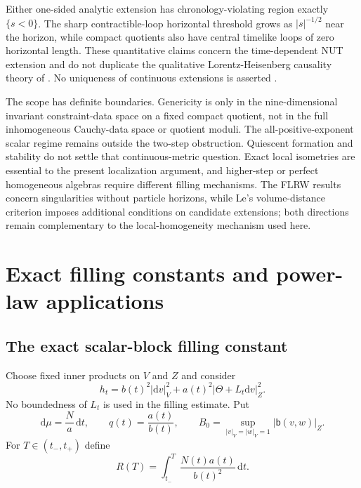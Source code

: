 \documentclass[10pt,a4paper]{article}
\numberwithin{equation}{section}
\theoremstyle{definition}
\theoremstyle{remark}
\newcommand{\dd}{\mathrm d}
\begin{document}
Either one-sided analytic extension has chronology-violating region
exactly $\{s<0\}$.  The sharp contractible-loop horizontal threshold
grows as $|s|^{-1/2}$ near the horizon, while compact quotients also have
central timelike loops of zero horizontal length.  These quantitative
claims concern the time-dependent NUT extension and do not duplicate the
qualitative Lorentz-Heisenberg causality theory of
\cite{GuediriLorentz2003,GuediriGlobal2003,GuediriCriterion2008}.  No
uniqueness of continuous extensions is asserted
\cite{SbierskiUniqueness}.

The scope has definite boundaries.  Genericity is only in the
nine-dimensional invariant constraint-data space on a fixed compact
quotient, not in the full inhomogeneous Cauchy-data space or quotient
moduli.  The all-positive-exponent scalar regime remains outside the
two-step obstruction.  Quiescent formation and stability
\cite{FournodavlosRodnianskiSpeck2023,OudeGroenigerPetersenRingstrom,
FrancoGrisalesRingstrom2026,FrancoGrisalesLocalized2026}
do not settle that continuous-metric question.  Exact local isometries
are essential to the present localization argument, and higher-step or
perfect homogeneous algebras require different filling mechanisms.  The
FLRW results \cite{SbierskiFLRW,LingFLRW} concern singularities without
particle horizons, while Le's volume-distance criterion
\cite{LeVDR} imposes additional conditions on candidate extensions; both
directions remain complementary to the local-homogeneity mechanism used
here.

\clearpage

\appendix
\section{Exact filling constants and power-law applications}
\label{sec:applications}

\subsection{The exact scalar-block filling constant}

Choose fixed inner products on $V$ and $Z$ and consider
\begin{equation}
 h_t=b(t)^2|\dd v|_V^2+
 a(t)^2|\Theta+L_t\dd v|_Z^2.
 \label{eq:scalar-block-metric}
\end{equation}
No boundedness of $L_t$ is used in the filling estimate.  Put
\begin{equation}
 \dd\mu=\frac Na\,\dd t,
 \qquad q(t)=\frac{a(t)}{b(t)},
 \qquad
 B_0=\sup_{|v|_V=|w|_V=1}|\mathsf b(v,w)|_Z.
 \label{eq:scalar-data}
\end{equation}
For $T\in(t_-,t_+)$ define
\begin{equation}
 R(T)=\int_{t_-}^T\frac{N(t)a(t)}{b(t)^2}\,\dd t.
 \label{eq:area-time}
\end{equation}
\end{document}
